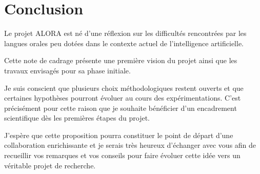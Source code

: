
\section*{Conclusion}


Le projet ALORA est né d'une réflexion sur les difficultés rencontrées
par les langues orales peu dotées dans le contexte actuel de
l'intelligence artificielle.

Cette note de cadrage présente une première vision du projet ainsi que
les travaux envisagés pour sa phase initiale.

Je suis conscient que plusieurs choix méthodologiques restent ouverts et
que certaines hypothèses pourront évoluer au cours des expérimentations.
C'est précisément pour cette raison que je souhaite bénéficier d'un
encadrement scientifique dès les premières étapes du projet.

J'espère que cette proposition pourra constituer le point de départ
d'une collaboration enrichissante et je serais très heureux d'échanger
avec vous afin de recueillir vos remarques et vos conseils pour faire
évoluer cette idée vers un véritable projet de recherche.